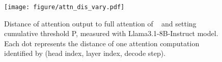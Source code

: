 \begin{figure}[t]
    \centering
    \texttt{[image: figure/attn\_dis\_vary.pdf]}

    \caption{Distance of attention output to full attention of \quest~\cite{tang2024questqueryawaresparsityefficient} and setting cumulative \as{} threshold P, measured with Llama3.1-8B-Instruct model. Each dot represents the distance of one attention computation identified by (head index, layer index, decode step). }
    \label{fig:attn_dis_vary}
\end{figure}
